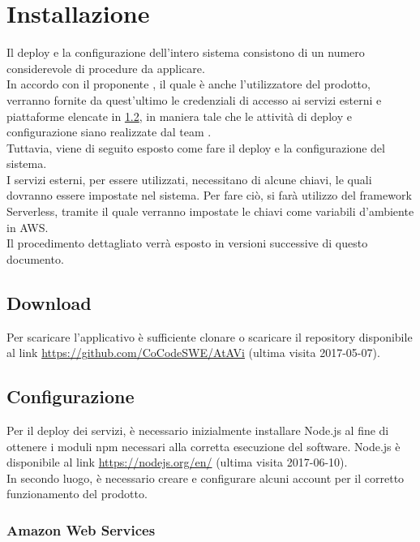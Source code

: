 \section{Installazione}
Il deploy e la configurazione dell'intero sistema consistono di un numero considerevole di procedure da applicare.\\
In accordo con il proponente \PROPONENTE, il quale è anche l'utilizzatore del prodotto, verranno fornite da quest'ultimo le credenziali di accesso ai servizi esterni e piattaforme elencate in \ref{configurazione}, in maniera tale che le attività di deploy e configurazione siano realizzate dal team \GRUPPO.\\
Tuttavia, viene di seguito esposto come fare il deploy e la configurazione del sistema.\\
I servizi esterni, per essere utilizzati, necessitano di alcune chiavi, le quali dovranno essere impostate nel sistema. Per fare ciò, si farà utilizzo del framework Serverless, tramite il quale verranno impostate le chiavi come variabili d'ambiente in AWS.\\
Il procedimento dettagliato verrà esposto in versioni successive di questo documento.
\subsection{Download}\label{download}
Per scaricare l'applicativo è sufficiente clonare o scaricare il repository disponibile al link \url{https://github.com/CoCodeSWE/AtAVi} (ultima visita 2017-05-07).

\subsection{Configurazione}\label{configurazione}
Per il deploy dei servizi, è necessario inizialmente installare Node.js al fine di  ottenere i moduli npm necessari alla corretta esecuzione del software. Node.js è disponibile al link \url{https://nodejs.org/en/} (ultima visita 2017-06-10).\\In secondo luogo, è necessario creare e configurare alcuni account per il corretto funzionamento del prodotto.

\subsubsection{Amazon Web Services}
